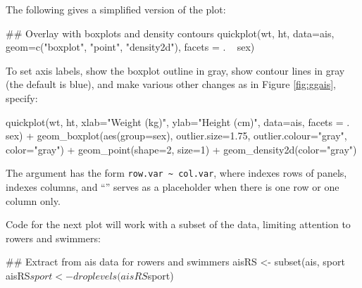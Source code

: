 The following gives a simplified version of the plot:\vspace*{-3pt}
\begin{Schunk}
\begin{Sinput}
## Overlay with boxplots and density contours
quickplot(wt, ht, data=ais,
          geom=c("boxplot", "point", "density2d"),
          facets = . ~ sex)
\end{Sinput}
\end{Schunk}
To set axis labels, show the boxplot outline in gray, show contour
lines in gray (the default is blue), and make various other changes
as in Figure \ref{fig:ggais}, specify:\vspace*{-3pt}
\begin{Schunk}
\begin{Sinput}
quickplot(wt, ht, xlab="Weight (kg)",
          ylab="Height (cm)", data=ais,
          facets = . ~ sex) +
  geom_boxplot(aes(group=sex),
               outlier.size=1.75,
               outlier.colour="gray",
               color="gray") +
  geom_point(shape=2, size=1) +
  geom_density2d(color="gray")
\end{Sinput}
\end{Schunk}

The  argument has the form \verb!row.var ~ col.var!,
where  indexes rows of panels, 
indexes columns, and ``'' serves as a placeholder when there is
one row or one column only.

Code for the next plot will work with a subset of the 
data, limiting attention to rowers and swimmers:
\begin{Schunk}
\begin{Sinput}
## Extract from ais data for rowers and swimmers
aisRS <- subset(ais, sport %
aisRS$sport <- droplevels(aisRS$sport)
\end{Sinput}
\end{Schunk}

